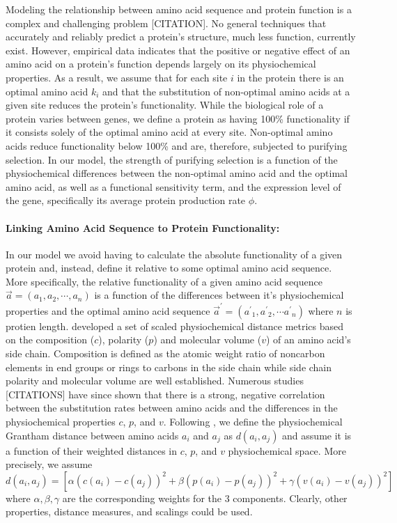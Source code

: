 \documentclass[13pt]{article}
\newcommand{\avecopt}{\ensuremath{\vec{a}^\prime}\xspace}
\newcommand{\aopt}{\ensuremath{a^\prime}\xspace}
\begin{document}

Modeling the relationship between amino acid sequence and protein function is a complex and challenging problem [CITATION].
No general techniques that accurately and reliably predict a protein's structure, much less function, currently exist.
However, empirical data indicates that the positive or negative effect of an amino acid on a protein's function depends largely on its physiochemical properties.
As a result, we assume that for each site $i$ in the protein there is an optimal amino acid $k_i$ and that the substitution of non-optimal amino acids at a given site reduces the protein's functionality.
While the biological role of a protein varies between genes, we define a protein as having 100\% functionality if it consists solely of the optimal amino acid at every site.
Non-optimal amino acids reduce functionality below 100\%  and are, therefore, subjected to purifying selection.
In our model, the strength of purifying selection is a function of the physiochemical differences between the non-optimal amino acid and the optimal amino acid, as well as a functional sensitivity term, and the expression level of the gene, specifically its average protein production rate $\phi$.


\paragraph*{Linking Amino Acid Sequence to  Protein Functionality:}
In our model we avoid having to calculate the absolute functionality of a given protein and, instead, define it relative to some optimal amino acid sequence.
More specifically, the relative functionality of a given amino acid sequence $\vec{a} = (a_1, a_2, \cdots, a_n)$  is a function of the differences between it's physiochemical properties  and the optimal amino acid sequence $\avecopt = (\aopt_1, \aopt_2, \cdots \aopt_n)$ where $n$ is protien length.
\citet{Grantham74} developed a set of scaled physiochemical distance metrics based on the composition ($c$), polarity ($p$) and molecular volume ($v$) of an amino acid's side chain.
Composition is defined as the atomic weight ratio of noncarbon elements in end groups or rings to carbons in the side chain while side chain polarity and molecular volume are well established.
Numerous studies [CITATIONS] have since shown that there is a strong, negative correlation between the substitution rates between amino acids and the differences in the physiochemical properties $c$, $p$, and $v$.
Following \citet{Grantham74}, we define the physiochemical Grantham distance between amino acids $a_i$ and $a_j$ as  $d(a_i, a_j)$ and assume it is a function of their weighted distances in $c$, $p$, and $v$ physiochemical space.
More precisely, we assume $d\left(a_i, a_j\right) = [\alpha \left(c\left(a_i\right)-c\left(a_j\right)\right)^2 + \beta\left(p\left(a_i\right) - p\left(a_j\right)\right)^2 + \gamma\left(v\left(a_i\right) - v\left(a_j\right)\right)^2]$ where $\alpha, \beta, \gamma$ are the corresponding weights for the 3 components.
Clearly, other properties, distance measures, and scalings could be used.
\end{document}
